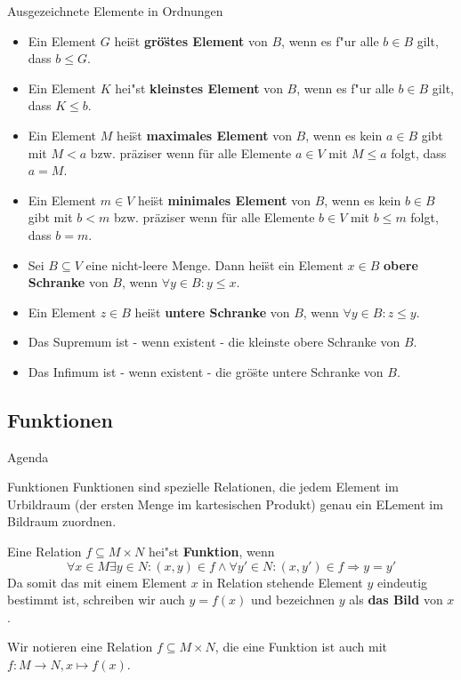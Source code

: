 \documentclass{beamer}
\begin{document}
\begin{frame}{Ausgezeichnete Elemente in Ordnungen}
  \begin{itemize}
    \item Ein Element $G$ hei\"st \textbf{gr\"o\"stes Element} von $B$, wenn es f"ur alle $b\in B$ gilt, dass $b\leq G$.
    \item Ein Element $K$ hei"st \textbf{kleinstes Element} von $B$, wenn es f"ur alle $b\in B$ gilt, dass $K\leq b$.
    \item Ein Element $M$ hei\"st \textbf{maximales Element} von $B$, wenn es kein $a \in B$ gibt mit $M < a$ bzw. pr\"aziser wenn f\"ur alle Elemente $a\in V$ mit $M\leq a$ folgt, dass $a=M$. 
    \item Ein Element $m \in V$ hei\"st \textbf{minimales Element} von $B$, wenn es kein $b \in B$ gibt mit $b < m$ bzw. pr\"aziser wenn f\"ur alle Elemente $b\in V$ mit $b\leq m$ folgt, dass $b=m$.
    \item Sei $B \subseteq V$ eine nicht-leere Menge. Dann hei\"st ein Element $x \in B$ \textbf{obere Schranke} von $B$, wenn $\forall y \in B: y \leq x$. 
    \item Ein Element $z \in B$ hei\"st \textbf{untere Schranke} von $B$, wenn $\forall y \in B: z \leq y$.
    \item Das Supremum ist - wenn existent - die kleinste obere Schranke von $B$.
    \item Das Infimum ist - wenn existent - die gr\"o\"ste untere Schranke von $B$.
  \end{itemize}
  
 


\end{frame}
\subsection{Funktionen}

\begin{frame}{Agenda}
   
    
  \tableofcontents[currentsection]
  \end{frame}
\begin{frame}{Funktionen}
  Funktionen sind spezielle Relationen, die jedem Element im Urbildraum (der ersten Menge im kartesischen Produkt) genau ein ELement im Bildraum zuordnen.
  \begin{definition}[Funktionen]
    Eine Relation $f\subseteq M\times N$ hei"st \textbf{Funktion}, wenn \[\forall x\in M \exists y\in N: (x,y)\in f\wedge \forall y'\in N:(x,y')\in f\Rightarrow y=y'\]
    Da somit das mit einem Element $x$ in Relation stehende Element $y$ eindeutig bestimmt ist, schreiben wir auch $y=f(x)$ und bezeichnen $y$ als \textbf{das Bild} von $x$.
  \end{definition}
  Wir notieren eine Relation $f\subseteq M\times N$, die eine Funktion ist auch mit $f:M\to N, x\mapsto f(x)$.
\end{frame}
\end{document}
